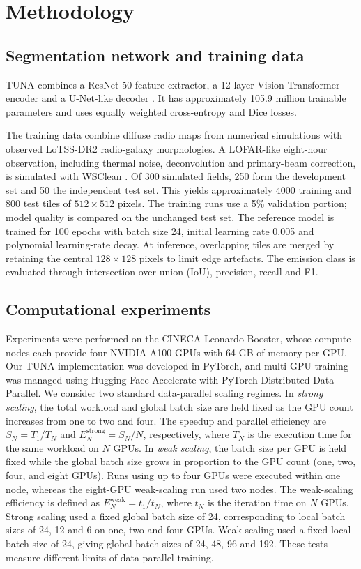 \documentclass[11pt,twoside]{article}
\begin{document}
\section{Methodology}

\subsection{Segmentation network and training data}
TUNA combines a ResNet-50 feature extractor, a 12-layer Vision Transformer encoder and
a U-Net-like decoder \citep{chen2021transunet,Sanvitale2025}. It has approximately
105.9 million trainable parameters and uses equally weighted cross-entropy
and Dice losses.

The training data combine diffuse radio maps from numerical simulations
with observed LoTSS-DR2 radio-galaxy morphologies. A LOFAR-like eight-hour observation, including
thermal noise, deconvolution and primary-beam correction, is simulated with
WSClean \citep{offringa-wsclean-2014}.
Of 300 simulated fields, 250 form the development set and 50 the
independent test set. This yields approximately 4000 training and 800
test tiles of $512\times512$ pixels. The training runs use a 5\% validation
portion; model quality is compared on the unchanged test set. The reference model is trained for
100 epochs with batch size 24, initial learning rate 0.005 and polynomial
learning-rate decay. At inference, overlapping tiles are merged by retaining
the central $128\times128$ pixels to limit edge artefacts. The emission class
is evaluated through intersection-over-union (IoU), precision, recall and F1.

\subsection{Computational experiments}

Experiments were performed on the CINECA Leonardo Booster,  whose compute
nodes each provide four NVIDIA A100 GPUs with 64 GB of memory per GPU. Our TUNA implementation
was developed in PyTorch, and multi-GPU training was managed using Hugging
Face Accelerate with PyTorch Distributed Data Parallel. 
We consider two standard
data-parallel scaling regimes. In \emph{strong scaling}, the total workload and global batch size are held fixed as the GPU count increases from one to two and four. The speedup and parallel efficiency are
$S_N=T_1/T_N$ and $E_N^{\mathrm{strong}}=S_N/N$, respectively, where $T_N$ is the execution time for the same workload on $N$ GPUs. In \emph{weak scaling}, the batch size per GPU is held fixed while the global batch size grows in proportion to the GPU count (one, two, four, and eight GPUs). Runs using up to four GPUs were executed within one node, whereas the
eight-GPU weak-scaling run used two nodes. The weak-scaling efficiency is defined as $E_N^{\mathrm{weak}}=t_1/t_N$, where $t_N$ is the iteration time on $N$ GPUs.
Strong scaling used a fixed global batch size of 24, corresponding to local
batch sizes of 24, 12 and 6 on one, two and four GPUs. Weak scaling used a
fixed local batch size of 24, giving global batch sizes of 24, 48, 96 and 192.
These tests measure different limits of data-parallel training. 
\end{document}
